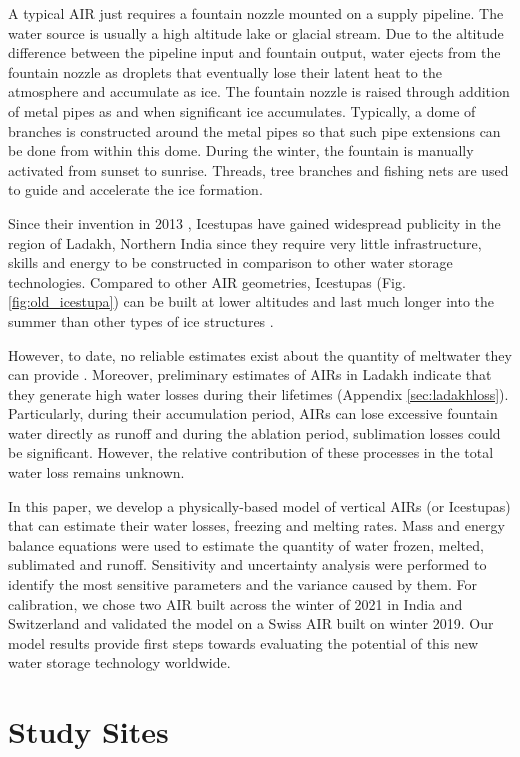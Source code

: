 \documentclass[utf8]{frontiersSCNS} %
\begin{document}
A typical AIR just requires a fountain nozzle mounted on a supply pipeline. The water source is usually a high
altitude lake or glacial stream. Due to the altitude difference between the pipeline input and fountain output,
water ejects from the fountain nozzle as droplets that eventually lose their latent heat to the atmosphere and
accumulate as ice. The fountain nozzle is raised through addition of metal pipes as and when significant ice
accumulates.  Typically, a dome of branches is constructed around the metal pipes so that such pipe extensions
can be done from within this dome. During the winter, the fountain is manually activated from sunset to sunrise.
Threads, tree branches and fishing nets are used to guide and accelerate the ice formation.

Since their invention in 2013 \citep{campaign}, Icestupas have gained widespread publicity in the region of
Ladakh, Northern India since they require very little infrastructure, skills and energy to be constructed in
comparison to other water storage technologies. Compared to other AIR geometries, Icestupas (Fig.
\ref{fig:old_icestupa}) can be built at lower altitudes and last much longer into the summer than other types of
ice structures \citep{campaign}.

However, to date, no reliable estimates exist about the quantity of meltwater they can provide
\citep{Nusser_2018} . Moreover, preliminary estimates of AIRs in Ladakh indicate that they generate high water
losses during their lifetimes (Appendix \ref{sec:ladakhloss}). Particularly, during their accumulation period, AIRs
can lose excessive fountain water directly as runoff and during the ablation period, sublimation losses could be
significant.  However, the relative contribution of these processes in the total water loss remains unknown.

In this paper, we develop a physically-based model of vertical AIRs (or Icestupas) that can estimate their water
losses, freezing and melting rates. Mass and energy balance equations were used to estimate the quantity of water
frozen, melted, sublimated and runoff. Sensitivity and uncertainty analysis were performed to identify the most
sensitive parameters and the variance caused by them. For calibration, we chose two AIR built across the winter of
2021 in India and Switzerland and validated the model on a Swiss AIR built on winter 2019. Our model results
provide first steps towards evaluating the potential of this new water storage technology worldwide.

\section{Study Sites}
\end{document}
